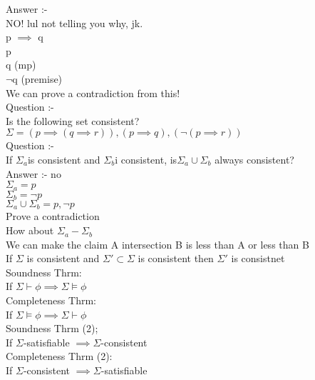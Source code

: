 \documentclass[12pt,oneside,notitlepage]{book}
\theoremstyle{definition}
\begin{document}
Answer :- \\
NO! lul not telling you why, jk. \\
p $\implies$ q \\
p \\
q (mp) \\
$\neg $q (premise) \\
We can prove a contradiction from this! \\

Question :-  \\
Is the following set consistent? \\
$\Sigma = { (p \implies (q \implies r)), (p \implies q), (\neg (p \implies r)) }$ \\

Question :- \\
If $\Sigma_a $is consistent and $\Sigma_b $i consistent, is$ \Sigma_a \cup \Sigma_b$ always consistent? \\
Answer :- no \\
$\Sigma_a =  { p}$ \\
$\Sigma_b = { \neg p}$ \\
$\Sigma_a \cup \Sigma_b = { p, \neg p}$ \\ 
Prove a contradiction \\
 
How about $\Sigma_a - \Sigma_b$  \\
We can make the claim A intersection  B is less than A or less than B \\
If $\Sigma$ is consistent and $\Sigma' \subset \Sigma$ is consistent then $\Sigma'$ is consistnet \\



Soundness Thrm: \\
If $\Sigma \vdash \phi \implies \Sigma \vDash \phi$ \\
 
Completeness Thrm: \\
If $\Sigma \vDash \phi \implies \Sigma \vdash \phi$  \\

Soundness Thrm (2); \\
If $\Sigma$-satisfiable $\implies \Sigma$-consistent \\

Completeness Thrm (2): \\
If $\Sigma$-consistent $\implies \Sigma$-satisfiable \\
\end{document}

